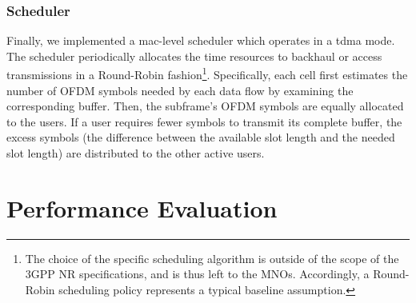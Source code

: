 \subsubsection{Scheduler}
\label{sub:scheduler}
Finally, we implemented a \gls{mac}-level scheduler which operates in a \gls{tdma} mode. The scheduler periodically allocates the time resources to backhaul or access transmissions in a Round-Robin fashion\footnote{The choice of the specific scheduling algorithm is outside of the scope of the 3GPP NR specifications, and is thus left to the MNOs. Accordingly, a Round-Robin scheduling policy represents a typical baseline assumption.}. Specifically, each cell first estimates the number of OFDM symbols needed by each data flow by examining the corresponding buffer. Then, the subframe's OFDM symbols are equally allocated to the users. If a user requires fewer symbols to transmit its complete buffer, the excess symbols (the difference between the available slot length and the needed slot length) are distributed to the other active users. \section {Performance Evaluation}
\label{s:simulation_analysis}

